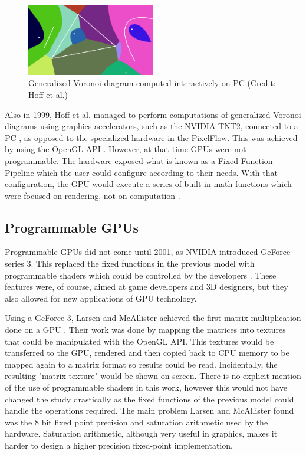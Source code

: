\begin{figure}[h]
    \centering
    \includegraphics[width=0.5\textwidth]{img/voronoi.png}
    \captionsetup{justification=centering}
    \caption{Generalized Voronoi diagram computed interactively on PC (Credit: Hoff et al.)}
\end{figure}

Also in 1999, Hoff et al. \cite{voronoi_diagrams_gpgpu} managed to perform computations of generalized Voronoi diagrams using graphics accelerators, such as the NVIDIA TNT2, connected to a PC \cite{brief_history_gpgpu}, as opposed to the specialized hardware in the PixelFlow. This was achieved by using the OpenGL API \cite{opengl}. However, at that time GPUs were not programmable. The hardware exposed what is known as a Fixed Function Pipeline which the user could configure according to their needs. With that configuration, the GPU would execute a series of built in math functions which were focused on rendering, not on computation \cite{opengl_fixed_function_pipeline}.

\subsection{Programmable GPUs}
Programmable GPUs did not come until 2001, as NVIDIA introduced GeForce series 3. This replaced the fixed functions in the previous model with programmable shaders which could be controlled by the developers \cite{nvidia_nfinitefx_pixel, nvidia_nfinitefx_vertex}. These features were, of course, aimed at game developers and 3D designers, but they also allowed for new applications of GPU technology.

Using a GeForce 3, Larsen and McAllister achieved the first matrix multiplication done on a GPU \cite{early_matrix_multiplication_gpgpu}. Their work was done by mapping the matrices into textures that could be manipulated with the OpenGL API. This textures would be transferred to the GPU, rendered and then copied back to CPU memory to be mapped again to a matrix format so results could be read. Incidentally, the resulting "matrix texture" would be shown on screen. There is no explicit mention of the use of programmable shaders in this work, however this would not have changed the study drastically as the fixed functions of the previous model could handle the operations required. The main problem Larsen and McAllister found was the 8 bit fixed point precision and saturation arithmetic used by the hardware. Saturation arithmetic, although very useful in graphics, makes it harder to design a higher precision fixed-point implementation.

